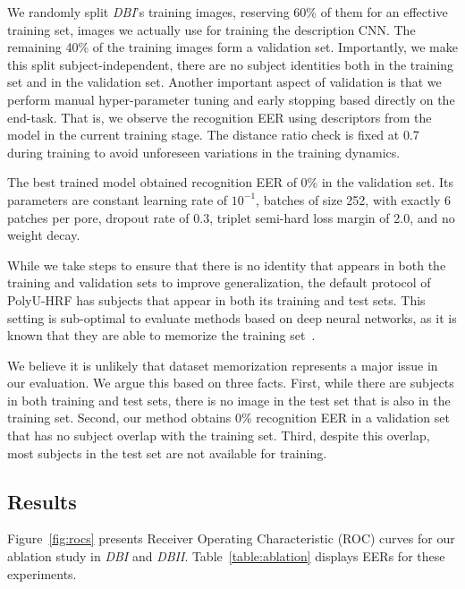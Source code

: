 \documentclass[10pt,twocolumn,letterpaper]{article}
\begin{document}
We randomly split \textit{DBI}'s training images, reserving 60\% of them for an effective training set, \ie images we actually use for training the description CNN.
The remaining 40\% of the training images form a validation set.
Importantly, we make this split subject-independent, \ie there are no subject identities both in the training set and in the validation set.
Another important aspect of validation is that we perform manual hyper-parameter tuning and early stopping based directly on the end-task.
That is, we observe the recognition EER using descriptors from the model in the current training stage.
The distance ratio check is fixed at 0.7 during training to avoid unforeseen variations in the training dynamics.

The best trained model obtained recognition EER of 0\% in the validation set.
Its parameters are constant learning rate of $10^{-1}$, batches of size 252, with exactly 6 patches per pore, dropout rate of 0.3, triplet semi-hard loss margin of 2.0, and no weight decay.

While we take steps to ensure that there is no identity that appears in both the training and validation sets to improve generalization, the default protocol of PolyU-HRF has subjects that appear in both its training and test sets.
This setting is sub-optimal to evaluate methods based on deep neural networks, as it is known that they are able to memorize the training set~\cite{deep-learning-generalization}.

We believe it is unlikely that dataset memorization represents a major issue in our evaluation.
We argue this based on three facts.
First, while there are subjects in both training and test sets, there is no image in the test set that is also in the training set.
Second, our method obtains 0\% recognition EER in a validation set that has no subject overlap with the training set.
Third, despite this overlap, most subjects in the test set are not available for training.

\subsection{Results}

Figure~\ref{fig:rocs} presents Receiver Operating Characteristic (ROC) curves for our ablation study in \textit{DBI} and \textit{DBII}.
Table~\ref{table:ablation} displays EERs for these experiments.
\end{document}
